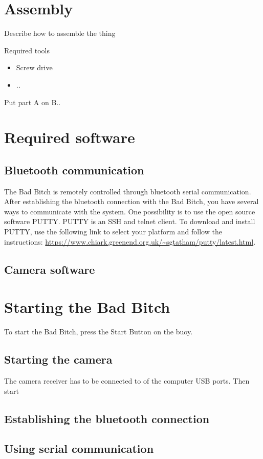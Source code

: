 \documentclass[letterpaper, 12 pt]{article}
\begin{document}
\section{Assembly}
Describe how to assemble the thing

Required tools
\begin{itemize}
\item Screw drive
\item ..
\end{itemize}

Put part A on B..
\section{Required software}
\subsection{Bluetooth communication}
The Bad Bitch is remotely controlled through bluetooth serial communication. After establishing the bluetooth connection with the Bad Bitch, you have several ways to communicate with the system. One possibility is to use the open source software PUTTY. PUTTY is an SSH and telnet client. To download and install PUTTY, use the following link to select your platform and follow the instructions:
\url{https://www.chiark.greenend.org.uk/~sgtatham/putty/latest.html}.
\subsection{Camera software}

\section{Starting the Bad Bitch}
To start the Bad Bitch, press the Start Button on the buoy.
\subsection{Starting the camera}
The camera receiver has to be connected to of the computer USB ports. Then start  
\subsection{Establishing the bluetooth connection}

\subsection{Using serial communication}
\end{document}
